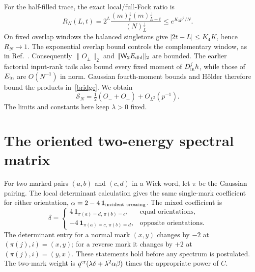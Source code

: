 \documentclass[11pt,a4paper]{article}
\newcommand{\W}[1]{\mathsf W_{#1}}
\begin{document}
For the half-filled trace, the exact local/full-Fock ratio is
\begin{equation}
 R_N(L,t)=2^L\frac{(m)_t^\downarrow(m)_{L-t}^\downarrow}
 {(N)_L^\downarrow}\leq e^{K_3p^2/N}.
\end{equation}
On fixed overlap windows the balanced singletons give
$|2t-L|\leq K_4K$, hence $R_N\to1$. The exponential overlap
bound controls the complementary window, as in Ref.~\cite{desc}.
Consequently $\|O_\pm\|_2$ and $\|\W2E_{\rm dbl}\|_2$ are bounded.
The earlier factorial input-rank tails also bound every fixed
moment of $D_{\rm in}^j h$, while those of $E_{\rm in}$ are
$O(N^{-1})$ in norm. Gaussian fourth-moment bounds and H\"older
therefore bound the products in~\eqref{bridge}. We obtain
\begin{equation}
 \boxed{\ \mathcal S_N=\tfrac12(O_-+O_+)+O_{L^2}(p^{-1}).\ } \label{strong}
\end{equation}
The limits and constants here keep $\lambda>0$ fixed.

\newpage
\section{The oriented two-energy spectral matrix}
For two marked pairs $(a,b)$ and $(c,d)$ in a Wick word, let
$\pi$ be the Gaussian pairing. The local determinant calculation
gives the same single-mark coefficient for either orientation,
$\alpha=2-4\,\mathbf1_{\rm incident\ crossing}$. The mixed coefficient is
\begin{equation}
 \delta=\begin{cases}
 4\,\mathbf1_{\pi(a)=d,\,\pi(b)=c},&\text{equal orientations},\\
 -4\,\mathbf1_{\pi(a)=c,\,\pi(b)=d},&\text{opposite orientations}.
 \end{cases} \label{minor}
\end{equation}
The determinant entry for a normal mark $(x,y)$ changes by $-2$
at $(\pi(j),i)=(x,y)$; for a reverse mark it changes by $+2$
at $(\pi(j),i)=(y,x)$. These statements hold before any spectrum
is postulated. The two-mark weight is
$q^{\rm cr}(\lambda\delta+\lambda^2\alpha\beta)$ times the
appropriate power of $C$.
\end{document}
